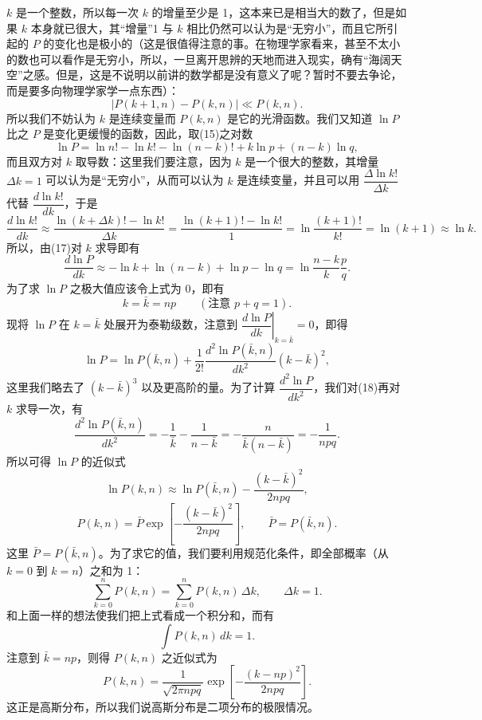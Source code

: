 $k$ 是一个整数，所以每一次 $k$ 的增量至少是 1，这本来已是相当大的数了，但是如果 $k$ 本身就已很大，其“增量”1 与 $k$ 相比仍然可以认为是“无穷小”，而且它所引起的 $P$ 的变化也是极小的（这是很值得注意的事。在物理学家看来，甚至不太小的数也可以看作是无穷小，所以，一旦离开思辨的天地而进入现实，确有“海阔天空”之感。但是，这是不说明以前讲的数学都是没有意义了呢？暂时不要去争论，而是要多向物理学家学一点东西）：
\begin{equation}
 |P(k+1,n)-P(k,n)|\ll P(k,n).
 \tag{16}
\end{equation}
所以我们不妨认为 $k$ 是连续变量而 $P(k,n)$ 是它的光滑函数。我们又知道 $\ln P$ 比之 $P$ 是变化更缓慢的函数，因此，取(15)之对数
\begin{equation}
 \ln P=\ln n!-\ln k!-\ln(n-k)!+k\ln p+(n-k)\ln q,
 \tag{17}
\end{equation}
而且双方对 $k$ 取导数：这里我们要注意，因为 $k$ 是一个很大的整数，其增量 $\Delta k=1$ 可以认为是“无穷小”，从而可以认为 $k$ 是连续变量，并且可以用 $\dfrac{\Delta\ln k!}{\Delta k}$ 代替 $\dfrac{d\ln k!}{dk}$，于是
\[
 \frac{d\ln k!}{dk}\approx\frac{\ln(k+\Delta k)!-\ln k!}{\Delta k}
 =\frac{\ln(k+1)!-\ln k!}{1}
 =\ln\frac{(k+1)!}{k!}=\ln(k+1)\approx\ln k.
\]
所以，由(17)对 $k$ 求导即有
\begin{equation}
 \frac{d\ln P}{dk}\approx-\ln k+\ln(n-k)+\ln p-\ln q
 =\ln\frac{n-k}{k}\frac pq.
 \tag{18}
\end{equation}
为了求 $\ln P$ 之极大值应该令上式为 0，即有
\[
 k=\bar k=np\qquad(\text{注意 }p+q=1).
\]
现将 $\ln P$ 在 $k=\bar k$ 处展开为泰勒级数，注意到 $\left.\dfrac{d\ln P}{dk}\right|_{k=\bar k}=0$，即得
\[
 \ln P=\ln P(\bar k,n)+\frac1{2!}\frac{d^2\ln P(\bar k,n)}{dk^2}(k-\bar k)^2,
\]
这里我们略去了 $(k-\bar k)^3$ 以及更高阶的量。为了计算 $\dfrac{d^2\ln P}{dk^2}$，我们对(18)再对 $k$ 求导一次，有
\[
 \frac{d^2\ln P(\bar k,n)}{dk^2}
 =-\frac1{\bar k}-\frac1{n-\bar k}
 =-\frac n{\bar k(n-\bar k)}
 =-\frac1{npq}.
\]
所以可得 $\ln P$ 的近似式
\[
 \ln P(k,n)\approx\ln P(\bar k,n)-\frac{(k-\bar k)^2}{2npq},
\]
\begin{equation}
 P(k,n)=\bar P\exp\!\left[-\frac{(k-\bar k)^2}{2npq}\right],
 \qquad \bar P=P(\bar k,n).
 \tag{19}
\end{equation}
这里 $\bar P=P(\bar k,n)$。为了求它的值，我们要利用规范化条件，即全部概率（从 $k=0$ 到 $k=n$）之和为 1：
\[
 \sum_{k=0}^nP(k,n)=\sum_{k=0}^nP(k,n)\,\Delta k,\qquad\Delta k=1.
\]
和上面一样的想法使我们把上式看成一个积分和，而有
\[
 \int P(k,n)\,dk=1.
\]
注意到 $\bar k=np$，则得 $P(k,n)$ 之近似式为
\begin{equation}
 P(k,n)=\frac1{\sqrt{2\pi npq}}\exp\!\left[-\frac{(k-np)^2}{2npq}\right].
 \tag{20}
\end{equation}
这正是高斯分布，所以我们说高斯分布是二项分布的极限情况。

